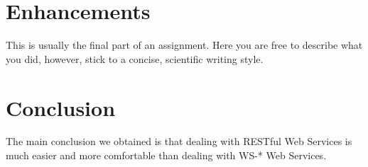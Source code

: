 \documentclass{report}
\begin{document}
\section{Enhancements}

This is usually the final part of an assignment.
Here you are free to describe what you did, however, stick to a concise, scientific writing style.

\section{Conclusion}

The main conclusion we obtained is that dealing with RESTful Web Services is much easier and more comfortable than dealing with WS-* Web Services.



\end{document}
